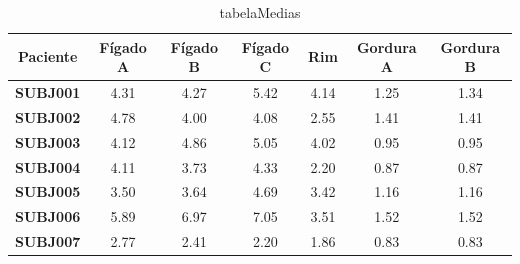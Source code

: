 \documentclass[idxtotoc,hyperref,openany]{labbook} %
\begin{document}
\begin{table}[]
	\centering
	\caption{tabelaMedias}
	\label{tabelaMedias}
	\begin{tabular}{ccccccc}
		\hline
		\multicolumn{1}{|c|}{\textbf{Paciente}} & \multicolumn{1}{c|}{\textbf{Fígado A}} & \multicolumn{1}{c|}{\textbf{Fígado B}} & \multicolumn{1}{c|}{\textbf{Fígado C}} & \multicolumn{1}{c|}{\textbf{Rim}} & \multicolumn{1}{c|}{\textbf{Gordura A}} & \multicolumn{1}{c|}{\textbf{Gordura B}} \\ \hline
		\multicolumn{1}{|c|}{\textbf{SUBJ001}}  & \multicolumn{1}{c|}{4.31}              & \multicolumn{1}{c|}{4.27}              & \multicolumn{1}{c|}{5.42}              & \multicolumn{1}{c|}{4.14}         & \multicolumn{1}{c|}{1.25}               & \multicolumn{1}{c|}{1.34}               \\ \hline
		\multicolumn{1}{|c|}{\textbf{SUBJ002}}  & \multicolumn{1}{c|}{4.78}              & \multicolumn{1}{c|}{4.00}              & \multicolumn{1}{c|}{4.08}              & \multicolumn{1}{c|}{2.55}         & \multicolumn{1}{c|}{1.41}               & \multicolumn{1}{c|}{1.41}               \\ \hline
		\multicolumn{1}{|c|}{\textbf{SUBJ003}}  & \multicolumn{1}{c|}{4.12}              & \multicolumn{1}{c|}{4.86}              & \multicolumn{1}{c|}{5.05}              & \multicolumn{1}{c|}{4.02}         & \multicolumn{1}{c|}{0.95}               & \multicolumn{1}{c|}{0.95}               \\ \hline
		\multicolumn{1}{|c|}{\textbf{SUBJ004}}  & \multicolumn{1}{c|}{4.11}              & \multicolumn{1}{c|}{3.73}              & \multicolumn{1}{c|}{4.33}              & \multicolumn{1}{c|}{2.20}         & \multicolumn{1}{c|}{0.87}               & \multicolumn{1}{c|}{0.87}               \\ \hline
		\multicolumn{1}{|c|}{\textbf{SUBJ005}}  & \multicolumn{1}{c|}{3.50}              & \multicolumn{1}{c|}{3.64}              & \multicolumn{1}{c|}{4.69}              & \multicolumn{1}{c|}{3.42}         & \multicolumn{1}{c|}{1.16}               & \multicolumn{1}{c|}{1.16}               \\ \hline
		\multicolumn{1}{|c|}{\textbf{SUBJ006}}  & \multicolumn{1}{c|}{5.89}              & \multicolumn{1}{c|}{6.97}              & \multicolumn{1}{c|}{7.05}              & \multicolumn{1}{c|}{3.51}         & \multicolumn{1}{c|}{1.52}               & \multicolumn{1}{c|}{1.52}               \\ \hline
		\multicolumn{1}{|c|}{\textbf{SUBJ007}}  & \multicolumn{1}{c|}{2.77}              & \multicolumn{1}{c|}{2.41}              & \multicolumn{1}{c|}{2.20}              & \multicolumn{1}{c|}{1.86}         & \multicolumn{1}{c|}{0.83}               & \multicolumn{1}{c|}{0.83}               \\ \hline

\end{tabular}
\end{table}
\end{document}
